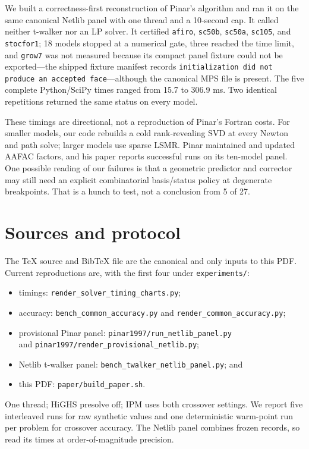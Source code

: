 \documentclass[11pt]{article}
\newcommand{\code}[1]{\texttt{#1}}
\begin{document}
We built a correctness-first reconstruction of Pinar's algorithm and ran it on the same canonical Netlib panel with one thread and a 10-second cap. It called neither t-walker nor an LP solver. It certified \code{afiro}, \code{sc50b}, \code{sc50a}, \code{sc105}, and \code{stocfor1}; 18 models stopped at a numerical gate, three reached the time limit, and \code{grow7} was not measured because its compact panel fixture could not be exported---the shipped fixture manifest records \code{initialization did not produce an accepted face}---although the canonical MPS file is present. The five complete Python/SciPy times ranged from 15.7 to 306.9 ms. Two identical repetitions returned the same status on every model.

These timings are directional, not a reproduction of Pinar's Fortran costs. For smaller models, our code rebuilds a cold rank-revealing SVD at every Newton and path solve; larger models use sparse LSMR. Pinar maintained and updated AAFAC factors, and his paper reports successful runs on its ten-model panel. One possible reading of our failures is that a geometric predictor and corrector may still need an explicit combinatorial basis/status policy at degenerate breakpoints. That is a hunch to test, not a conclusion from 5 of 27.

\section{Sources and protocol}

The TeX source and BibTeX file are the canonical and only inputs to this PDF. Current reproductions are, with the first four under \code{experiments/}:
\begin{itemize}
  \item timings: \code{render\_solver\_timing\_charts.py};
  \item accuracy: \code{bench\_common\_accuracy.py} and
        \code{render\_common\_accuracy.py};
  \item provisional Pinar panel: \code{pinar1997/run\_netlib\_panel.py}\\
        and \code{pinar1997/render\_provisional\_netlib.py};
  \item Netlib t-walker panel: \code{bench\_twalker\_netlib\_panel.py}; and
  \item this PDF: \code{paper/build\_paper.sh}.
\end{itemize}
One thread; HiGHS presolve off; IPM uses both crossover settings. We report five interleaved runs for raw synthetic values and one deterministic warm-point run per problem for crossover accuracy. The Netlib panel combines frozen records, so read its times at order-of-magnitude precision.
\end{document}
